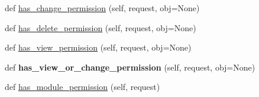 \begin{DoxyCompactItemize}
\item 
def \mbox{\hyperlink{classdjango_1_1contrib_1_1admin_1_1options_1_1_base_model_admin_a4277a867d799a4ba8c1b113bd891b48b}{has\+\_\+change\+\_\+permission}} (self, request, obj=None)
\item 
def \mbox{\hyperlink{classdjango_1_1contrib_1_1admin_1_1options_1_1_base_model_admin_a533b21c21a8fb1baf9d92ce22c46ff04}{has\+\_\+delete\+\_\+permission}} (self, request, obj=None)
\item 
def \mbox{\hyperlink{classdjango_1_1contrib_1_1admin_1_1options_1_1_base_model_admin_a6ea3f350aa50399449f511482df5cffb}{has\+\_\+view\+\_\+permission}} (self, request, obj=None)
\item 
\mbox{\label{classdjango_1_1contrib_1_1admin_1_1options_1_1_base_model_admin_a3e2e1b12cb6f9236136c3413542edb3a}} 
def {\bfseries has\+\_\+view\+\_\+or\+\_\+change\+\_\+permission} (self, request, obj=None)
\item 
def \mbox{\hyperlink{classdjango_1_1contrib_1_1admin_1_1options_1_1_base_model_admin_a863d817753ebb25163d6704b56b05d5a}{has\+\_\+module\+\_\+permission}} (self, request)
\end{DoxyCompactItemize}
